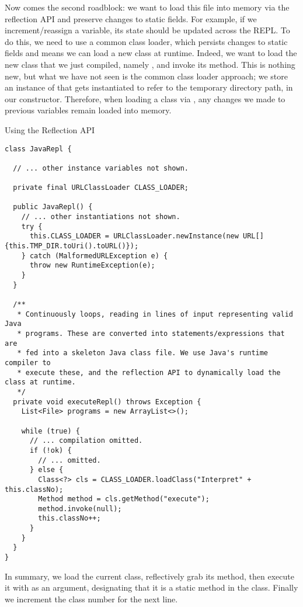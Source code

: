 Now comes the second roadblock: we want to load this file into memory via the reflection API and preserve changes to static fields. For example, if we increment/reassign a variable, its state should be updated across the REPL. To do this, we need to use a common class loader, which persists changes to static fields and means we can load a new class at runtime. Indeed, we want to load the new class that we just compiled, namely , and invoke its  method. This is nothing new, but what we have not seen is the common class loader approach; we store an instance of  that gets instantiated to refer to the temporary directory path, in our constructor. Therefore, when loading a class via , any changes we made to previous variables remain loaded into memory.

\begin{cl}[]{Using the Reflection API}
\begin{lstlisting}[language=MyJava]
class JavaRepl {

  // ... other instance variables not shown.

  private final URLClassLoader CLASS_LOADER;

  public JavaRepl() {
    // ... other instantiations not shown.
    try {
      this.CLASS_LOADER = URLClassLoader.newInstance(new URL[]{this.TMP_DIR.toUri().toURL()});
    } catch (MalformedURLException e) {
      throw new RuntimeException(e);
    }
  }

  /**
   * Continuously loops, reading in lines of input representing valid Java
   * programs. These are converted into statements/expressions that are
   * fed into a skeleton Java class file. We use Java's runtime compiler to
   * execute these, and the reflection API to dynamically load the class at runtime.
   */
  private void executeRepl() throws Exception {
    List<File> programs = new ArrayList<>();

    while (true) {
      // ... compilation omitted.
      if (!ok) {
        // ... omitted.
      } else {
        Class<?> cls = CLASS_LOADER.loadClass("Interpret" + this.classNo);
        Method method = cls.getMethod("execute");
        method.invoke(null);
        this.classNo++;
      }
    }
  }
}
\end{lstlisting}
\end{cl}

In summary, we load the current class, reflectively grab its  method, then execute it with  as an argument, designating that it is a static method in the class. Finally we increment the class number for the next line.